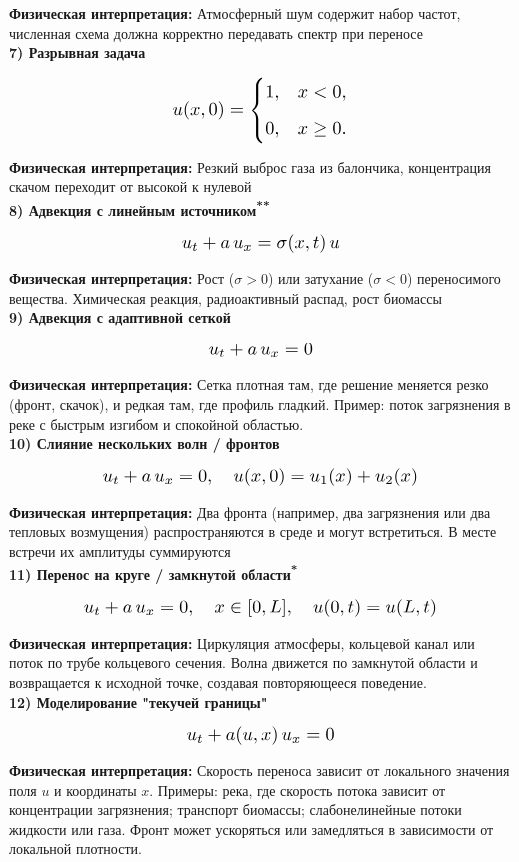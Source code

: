 \documentclass{article}
\begin{document}
\noindent\textbf{Физическая интерпретация:}  
Атмосферный шум содержит набор частот, численная схема должна корректно передавать спектр при переносе\\


{\Large \textbf{7) Разрывная задача}}

\[
\scalebox{1.3}{$
u(x,0) =
\begin{cases}
1, & x < 0,\\[2mm]
0, & x \ge 0.
\end{cases}
$}
\]


\noindent\textbf{Физическая интерпретация:}  
Резкий выброс газа из балончика, концентрация скачом переходит от высокой к нулевой\\


{\Large \textbf{8) Адвекция с линейным источником\textsuperscript{*}\textsuperscript{*}}}

\[
\scalebox{1.3}{$u_t + a\, u_x = \sigma(x,t)\, u$}
\]

\noindent\textbf{Физическая интерпретация:}  
Рост (\(\sigma>0\)) или затухание (\(\sigma<0\)) переносимого вещества.  
Химическая реакция, радиоактивный распад, рост биомассы\\


{\Large \textbf{9) Адвекция с адаптивной сеткой}}

\[
\scalebox{1.3}{$u_t + a\, u_x = 0$}
\]

\noindent\textbf{Физическая интерпретация:}  
Сетка плотная там, где решение меняется резко (фронт, скачок), и редкая там, где профиль гладкий.  
Пример: поток загрязнения в реке с быстрым изгибом и спокойной областью.\\


{\Large \textbf{10) Слияние нескольких волн / фронтов}}

\[
\scalebox{1.3}{$u_t + a\, u_x = 0, \quad u(x,0) = u_1(x) + u_2(x)$}
\]

\noindent\textbf{Физическая интерпретация:}  
Два фронта (например, два загрязнения или два тепловых возмущения) распространяются в среде и могут встретиться. В месте встречи их амплитуды суммируются\\


{\Large \textbf{11) Перенос на круге / замкнутой области\textsuperscript{*}}}

\[
\scalebox{1.3}{$u_t + a\, u_x = 0, \quad x \in [0,L], \quad u(0,t) = u(L,t)$}
\]

\noindent\textbf{Физическая интерпретация:}  
Циркуляция атмосферы, кольцевой канал или поток по трубе кольцевого сечения. Волна движется по замкнутой области и возвращается к исходной точке, создавая повторяющееся поведение.\\


{\Large \textbf{12) Моделирование "текучей границы"}}

\[
\scalebox{1.3}{$u_t + a(u,x)\, u_x = 0$}
\]

\noindent\textbf{Физическая интерпретация:}  
Скорость переноса зависит от локального значения поля \(u\) и координаты \(x\). Примеры: река, где скорость потока зависит от концентрации загрязнения; транспорт биомассы; слабонелинейные потоки жидкости или газа. Фронт может ускоряться или замедляться в зависимости от локальной плотности.\\
\end{document}
